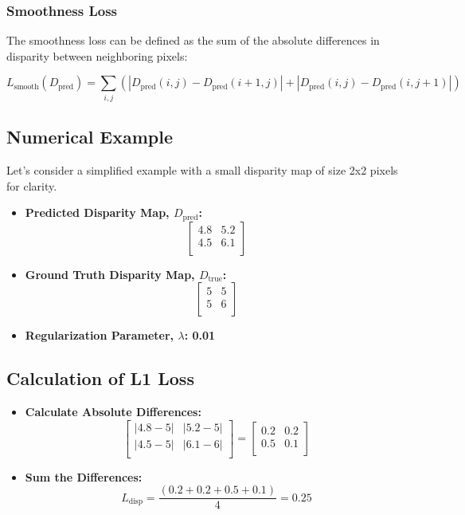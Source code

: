 \documentclass[22pt]{report}
\begin{document}
\subsubsection{Smoothness Loss}
The smoothness loss can be defined as the sum of the absolute differences in disparity between neighboring pixels:
\begin{center}
        \[
        L_{\text{smooth}}(D_{\text{pred}}) = \sum_{i,j} \left( \left| D_{\text{pred}}(i,j) - D_{\text{pred}}(i+1,j) \right| + \left| D_{\text{pred}}(i,j) - D_{\text{pred}}(i,j+1) \right| \right)
        \]
\end{center}
\vspace{15}
\subsection*{Numerical Example}
Let's consider a simplified example with a small disparity map of size 2x2 pixels for clarity.
\begin{itemize}
    \item \textbf{Predicted Disparity Map, \( D_{\text{pred}} \):}
            \[
            \begin{bmatrix}
            4.8 & 5.2 \\
            4.5 & 6.1 \\
            \end{bmatrix}
            \]
    \item \textbf{Ground Truth Disparity Map, \( D_{\text{true}} \):}
            \[
            \begin{bmatrix}
            5 & 5 \\
            5 & 6 \\
            \end{bmatrix}
            \]
    \item \textbf{Regularization Parameter, \( \lambda \): 0.01}
\end{itemize}
\vspace{10}
\subsection*{Calculation of L1 Loss}
\begin{itemize}
    \item \textbf{Calculate Absolute Differences:}
            \[
            \begin{bmatrix}
            |4.8 - 5| & |5.2 - 5| \\
            |4.5 - 5| & |6.1 - 6| \\
            \end{bmatrix}
            =
            \begin{bmatrix}
            0.2 & 0.2 \\
            0.5 & 0.1 \\
            \end{bmatrix}
            \]
    \item \textbf{Sum the Differences:}
            \[
            L_{\text{disp}} = \frac{(0.2 + 0.2 + 0.5 + 0.1)}{4} = 0.25
            \]
\end{itemize}
\vspace{10}
\end{document}
